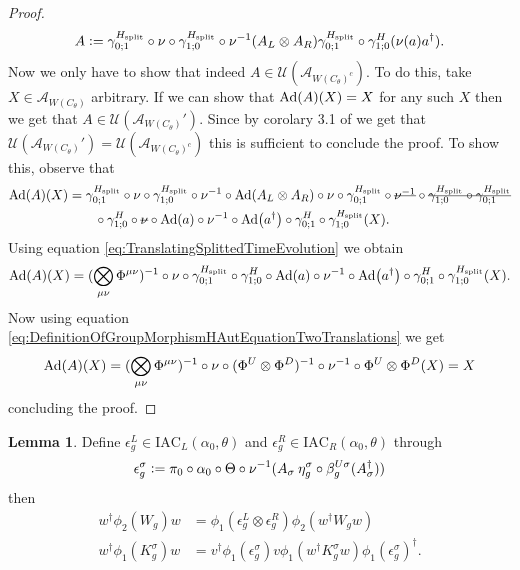 \documentclass[12pt,a4paper,twoside]{article}
\newcommand{\stkout}[1]{\ifmmode\text{\sout{\ensuremath{#1}}}\else\sout{#1}\fi}
\newcommand{\IAC}{\textrm{IAC}}
\newcommand{\defeq}{\vcentcolon=}
\let\originalleft\left
\let\originalright\right
\renewcommand{\left}{\mathopen{}\mathclose\bgroup\originalleft}
\renewcommand{\right}{\aftergroup\egroup\originalright}
\newcommand{\UU}{\mathcal U}
\renewcommand{\AA}{\mathcal A}
\newcommand{\Ad}[1]{\textrm{Ad}\left(#1\right)}
\theoremstyle{definition}
\newtheorem{lemma}[theorem]{Lemma}
\numberwithin{equation}{section}
\begin{document}
\begin{proof}
	\begin{equation}
		A\defeq \gamma^{H_\text{split}}_{0;1}\circ\nu\circ\gamma^{H_\text{split}}_{1;0}\circ\nu^{-1}(A_L\otimes A_R)\gamma^{H_\text{split}}_{0;1}\circ\gamma^H_{1;0}(\nu(a)a^\dagger).
	\end{equation}
	Now we only have to show that indeed $A\in\UU(\AA_{W(C_\theta)^c})$. To do this, take $X\in\AA_{W(C_\theta)}$ arbitrary. If we can show that $\Ad{A}(X)=X$ for any such $X$ then we get that $A\in\UU(\AA_{W(C_\theta)}')$. Since by corolary 3.1 of \cite{NaScWe_2013} we get that $\UU(\AA_{W(C_\theta)}')=\UU(\AA_{W(C_\theta)^c})$ this is sufficient to conclude the proof. To show this, observe that
	\begin{align}
		\Ad{A}(X)&=\gamma^{H_\text{split}}_{0;1}\circ\nu\circ\gamma^{H_\text{split}}_{1;0}\circ\nu^{-1}\circ\Ad{A_L\otimes A_R}\circ\nu\circ\gamma^{H_\text{split}}_{0;1}\circ\stkout{\nu^{-1}}\circ\stkout{\gamma^{H_\text{split}}_{1;0}\circ\gamma^{H_\text{split}}_{0;1}}\\
		&\nonumber
		\qquad\circ\gamma^H_{1;0}\circ\stkout{\nu}\circ\Ad{a}\circ\nu^{-1}\circ\Ad{a^\dagger}\circ\gamma^H_{0;1}\circ\gamma^{H_\text{split}}_{1;0}(X).
	\end{align}
	Using equation \eqref{eq:TranslatingSplittedTimeEvolution} we obtain
	\begin{equation}
		\Ad{A}(X)=(\bigotimes_{\mu\nu}\Phi^{\mu\nu})^{-1}\circ\nu\circ\gamma^{H_\text{split}}_{0;1}\circ\gamma^H_{1;0}\circ\Ad{a}\circ\nu^{-1}\circ\Ad{a^\dagger}\circ\gamma^H_{0;1}\circ\gamma^{H_\text{split}}_{1;0}(X).
	\end{equation}
	Now using equation \eqref{eq:DefinitionOfGroupMorphismHAutEquationTwoTranslations} we get
	\begin{equation}
		\Ad{A}(X)=(\bigotimes_{\mu\nu}\Phi^{\mu\nu})^{-1}\circ\nu\circ(\Phi^U\otimes\Phi^D)^{-1}\circ\nu^{-1}\circ\Phi^U\otimes\Phi^D(X)=X
	\end{equation}
	concluding the proof.
\end{proof}
\begin{lemma}
	Define $\epsilon^L_g\in\IAC_L(\alpha_0,\theta)$ and $\epsilon^R_g\in\IAC_R(\alpha_0,\theta)$ through
	\begin{align}
		\epsilon_g^\sigma\defeq \pi_0\circ\alpha_0\circ\Theta\circ\nu^{-1}(A_\sigma\:\eta_g^\sigma\circ\beta_{g}^{U\sigma}(A_\sigma^\dagger))
	\end{align}
	then
	\begin{align}
		w^\dagger \phi_2(W_g)w &= \phi_1(\epsilon_g^L\otimes\epsilon_g^R)\phi_2(w^\dagger W_g w)\\
		\label{eq:TransformationOfKUnderEpsilon}
		w^\dagger \phi_1(K_g^\sigma)w&=v^\dagger\phi_1(\epsilon_g^\sigma)v\phi_1(w^\dagger K_g^\sigma w)\phi_1(\epsilon_g^\sigma)^\dagger.
	\end{align}
\end{lemma}
\end{document}
